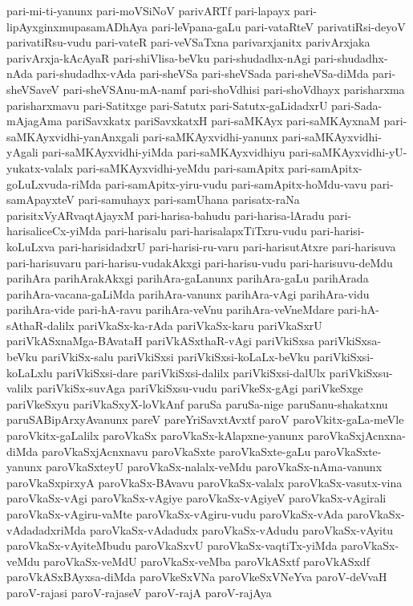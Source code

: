 {pari-mi-ti-yanunx
pari-moVSiNoV
parivARTf
pari-lapayx
pari-lipAyxginxmupasamADhAya
pari-leVpana-gaLu
pari-vataRteV
parivatiRsi-deyoV
parivatiRsu-vudu
pari-vateR
pari-veVSaTxna
parivarxjanitx
parivArxjaka
parivArxja-kAcAyaR
pari-shiVlisa-beVku
pari-shudadhx-nAgi
pari-shudadhx-nAda
pari-shudadhx-vAda
pari-sheVSa
pari-sheVSada
pari-sheVSa-diMda
pari-sheVSaveV
pari-sheVSAnu-mA-namf
pari-shoVdhisi
pari-shoVdhayx
parisharxma
parisharxmavu
pari-Satitxge
pari-Satutx
pari-Satutx-gaLidadxrU
pari-Sada-mAjagAma
pariSavxkatx
pariSavxkatxH
pari-saMKAyx
pari-saMKAyxnaM
pari-saMKAyxvidhi-yanAnxgali
pari-saMKAyxvidhi-yanunx
pari-saMKAyxvidhi-yAgali
pari-saMKAyxvidhi-yiMda
pari-saMKAyxvidhiyu
pari-saMKAyxvidhi-yU-yukatx-valalx
pari-saMKAyxvidhi-yeMdu
pari-samApitx
pari-samApitx-goLuLxvuda-riMda
pari-samApitx-yiru-vudu
pari-samApitx-hoMdu-vavu
pari-samApayxteV
pari-samuhayx
pari-samUhana
parisatx-raNa
parisitxVyARvaqtAjayxM
pari-harisa-bahudu
pari-harisa-lAradu
pari-harisaliceCx-yiMda
pari-harisalu
pari-harisalapxTiTxru-vudu
pari-harisi-koLuLxva
pari-harisidadxrU
pari-harisi-ru-varu
pari-harisutAtxre
pari-harisuva
pari-harisuvaru
pari-harisu-vudakAkxgi
pari-harisu-vudu
pari-harisuvu-deMdu
parihAra
parihArakAkxgi
parihAra-gaLanunx
parihAra-gaLu
parihArada
parihAra-vacana-gaLiMda
parihAra-vanunx
parihAra-vAgi
parihAra-vidu
parihAra-vide
pari-hA-ravu
parihAra-veVnu
parihAra-veVneMdare
pari-hA-sAthaR-dalilx
pariVkaSx-ka-rAda
pariVkaSx-karu
pariVkaSxrU
pariVkASxnaMga-BAvataH
pariVkASxthaR-vAgi
pariVkiSxsa
pariVkiSxsa-beVku
pariVkiSx-salu
pariVkiSxsi
pariVkiSxsi-koLaLx-beVku
pariVkiSxsi-koLaLxlu
pariVkiSxsi-dare
pariVkiSxsi-dalilx
pariVkiSxsi-dalUlx
pariVkiSxsu-valilx
pariVkiSx-suvAga
pariVkiSxsu-vudu
pariVkeSx-gAgi
pariVkeSxge
pariVkeSxyu
pariVkaSxyX-loVkAnf
paruSa
paruSa-nige
paruSanu-shakatxnu
paruSABipArxyAvanunx
pareV
pareYriSavxtAvxtf
paroV
paroVkitx-gaLa-meVle
paroVkitx-gaLalilx
paroVkaSx
paroVkaSx-kAlapxne-yanunx
paroVkaSxjAcnxna-diMda
paroVkaSxjAcnxnavu
paroVkaSxte
paroVkaSxte-gaLu
paroVkaSxte-yanunx
paroVkaSxteyU
paroVkaSx-nalalx-veMdu
paroVkaSx-nAma-vanunx
paroVkaSxpirxyA
paroVkaSx-BAvavu
paroVkaSx-valalx
paroVkaSx-vasutx-vina
paroVkaSx-vAgi
paroVkaSx-vAgiye
paroVkaSx-vAgiyeV
paroVkaSx-vAgirali
paroVkaSx-vAgiru-vaMte
paroVkaSx-vAgiru-vudu
paroVkaSx-vAda
paroVkaSx-vAdadadxriMda
paroVkaSx-vAdadudx
paroVkaSx-vAdudu
paroVkaSx-vAyitu
paroVkaSx-vAyiteMbudu
paroVkaSxvU
paroVkaSx-vaqtiTx-yiMda
paroVkaSx-veMdu
paroVkaSx-veMdU
paroVkaSx-veMba
paroVkASxtf
paroVkASxdf
paroVkASxBAyxsa-diMda
paroVkeSxVNa
paroVkeSxVNeYva
paroV-deVvaH
paroV-rajasi
paroV-rajaseV
paroV-rajA
paroV-rajAya
}
